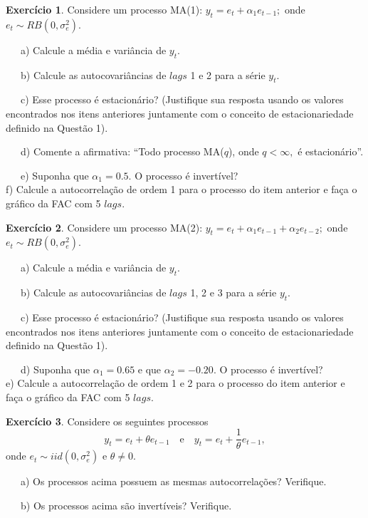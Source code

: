 \documentclass[
]{book}
\theoremstyle{definition}
\theoremstyle{definition}
\theoremstyle{definition}
\newtheorem{exercise}{Exercício}[chapter]
\theoremstyle{remark}
\begin{document}
\begin{exercise}
\protect\hypertarget{exr:ma1}{}{\label{exr:ma1} }Considere um processo MA(1):
\(y_t=e_t+\alpha_1e_{t-1};\) onde \(e_t \sim RB(0,\sigma^2_e)\).

~~~a) Calcule a média e variância de \(y_t\).

~~~b) Calcule as autocovariâncias de \(lags\) 1 e 2 para a série \(y_t\).

~~~c) Esse processo é estacionário? (Justifique sua resposta usando os valores encontrados nos itens anteriores juntamente com o conceito de estacionariedade definido na Questão 1).

~~~d) Comente a afirmativa: ``Todo processo MA(\(q\)), onde \(q < \infty,\) é estacionário''.

~~~e) Suponha que \(\alpha_1=0.5\). O processo é invertível?\\
\hspace*{0.333em}\hspace*{0.333em}\hspace*{0.333em}f) Calcule a autocorrelação de ordem 1 para o processo do item anterior e faça o gráfico da FAC com 5 \(lags\).
\end{exercise}

\begin{exercise}
\protect\hypertarget{exr:ma2}{}{\label{exr:ma2} } Considere um processo MA(2): \(y_t=e_t+\alpha_1e_{t-1}+\alpha_2e_{t-2};\) onde \(e_t \sim RB(0,\sigma^2_e)\).

~~~a) Calcule a média e variância de \(y_t\).

~~~b) Calcule as autocovariâncias de \(lags\) 1, 2 e 3 para a série \(y_t\).

~~~c) Esse processo é estacionário? (Justifique sua resposta usando os valores encontrados nos itens anteriores juntamente com o conceito de estacionariedade definido na Questão 1).

~~~d) Suponha que \(\alpha_1=0.65\) e que \(\alpha_2=-0.20\). O processo é invertível?\\
\hspace*{0.333em}\hspace*{0.333em}\hspace*{0.333em}e) Calcule a autocorrelação de ordem 1 e 2 para o processo do item anterior e faça o gráfico da FAC com 5 \(lags\).
\end{exercise}

\begin{exercise}
\protect\hypertarget{exr:p1p2}{}{\label{exr:p1p2} }Considere os seguintes processos
\[y_t=e_t+\theta e_{t-1} \quad\mbox{e} \quad y_t=e_t+\frac{1}{\theta}e_{t-1},\] onde \(e_t \sim iid(0,\sigma^2_e)\) e \(\theta \neq 0\).

~~~a) Os processos acima possuem as mesmas autocorrelações? Verifique.

~~~b) Os processos acima são invertíveis? Verifique.
\end{exercise}
\end{document}
